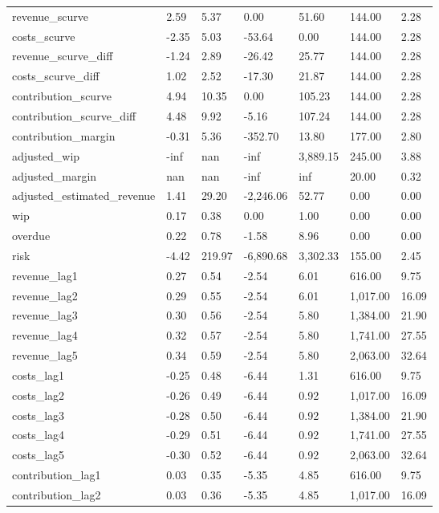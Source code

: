 \begin{landscape}
\begin{longtable}[h!]{lllllll}
revenue_scurve & 2.59 & 5.37 & 0.00 & 51.60 & 144.00 & 2.28 \\
costs_scurve & -2.35 & 5.03 & -53.64 & 0.00 & 144.00 & 2.28 \\
revenue_scurve_diff & -1.24 & 2.89 & -26.42 & 25.77 & 144.00 & 2.28 \\
costs_scurve_diff & 1.02 & 2.52 & -17.30 & 21.87 & 144.00 & 2.28 \\
contribution_scurve & 4.94 & 10.35 & 0.00 & 105.23 & 144.00 & 2.28 \\
contribution_scurve_diff & 4.48 & 9.92 & -5.16 & 107.24 & 144.00 & 2.28 \\
contribution_margin & -0.31 & 5.36 & -352.70 & 13.80 & 177.00 & 2.80 \\
adjusted_wip & -inf & nan & -inf & 3,889.15 & 245.00 & 3.88 \\
adjusted_margin & nan & nan & -inf & inf & 20.00 & 0.32 \\
adjusted_estimated_revenue & 1.41 & 29.20 & -2,246.06 & 52.77 & 0.00 & 0.00 \\
wip & 0.17 & 0.38 & 0.00 & 1.00 & 0.00 & 0.00 \\
overdue & 0.22 & 0.78 & -1.58 & 8.96 & 0.00 & 0.00 \\
risk & -4.42 & 219.97 & -6,890.68 & 3,302.33 & 155.00 & 2.45 \\
revenue_lag1 & 0.27 & 0.54 & -2.54 & 6.01 & 616.00 & 9.75 \\
revenue_lag2 & 0.29 & 0.55 & -2.54 & 6.01 & 1,017.00 & 16.09 \\
revenue_lag3 & 0.30 & 0.56 & -2.54 & 5.80 & 1,384.00 & 21.90 \\
revenue_lag4 & 0.32 & 0.57 & -2.54 & 5.80 & 1,741.00 & 27.55 \\
revenue_lag5 & 0.34 & 0.59 & -2.54 & 5.80 & 2,063.00 & 32.64 \\
costs_lag1 & -0.25 & 0.48 & -6.44 & 1.31 & 616.00 & 9.75 \\
costs_lag2 & -0.26 & 0.49 & -6.44 & 0.92 & 1,017.00 & 16.09 \\
costs_lag3 & -0.28 & 0.50 & -6.44 & 0.92 & 1,384.00 & 21.90 \\
costs_lag4 & -0.29 & 0.51 & -6.44 & 0.92 & 1,741.00 & 27.55 \\
costs_lag5 & -0.30 & 0.52 & -6.44 & 0.92 & 2,063.00 & 32.64 \\
contribution_lag1 & 0.03 & 0.35 & -5.35 & 4.85 & 616.00 & 9.75 \\
contribution_lag2 & 0.03 & 0.36 & -5.35 & 4.85 & 1,017.00 & 16.09 \\

\end{longtable}
\end{landscape}
